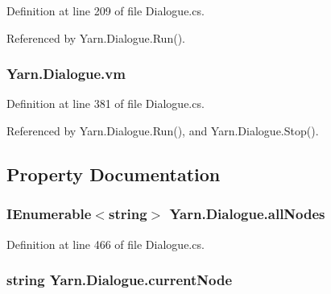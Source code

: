 Definition at line 209 of file Dialogue.\-cs.



Referenced by Yarn.\-Dialogue.\-Run().

\hypertarget{a00094_a8c1319357a9df6cff051328fb33224c7}{
\subsubsection[{vm}]{ Yarn.\-Dialogue.\-vm\hspace{0.3cm}{\ttfamily [private]}}}\label{a00094_a8c1319357a9df6cff051328fb33224c7}


Definition at line 381 of file Dialogue.\-cs.



Referenced by Yarn.\-Dialogue.\-Run(), and Yarn.\-Dialogue.\-Stop().



\subsection{Property Documentation}
\hypertarget{a00094_a0ee573e3d072bccf98ba1d975612d42c}{
\subsubsection[{all\-Nodes}]{\setlength{\rightskip}{0pt plus 5cm}I\-Enumerable$<$string$>$ Yarn.\-Dialogue.\-all\-Nodes\hspace{0.3cm}{\ttfamily [get]}}}\label{a00094_a0ee573e3d072bccf98ba1d975612d42c}


Definition at line 466 of file Dialogue.\-cs.

\hypertarget{a00094_af368b5c342d585dc6953876c5965ccc8}{
\subsubsection[{current\-Node}]{\setlength{\rightskip}{0pt plus 5cm}string Yarn.\-Dialogue.\-current\-Node\hspace{0.3cm}{\ttfamily [get]}}}\label{a00094_af368b5c342d585dc6953876c5965ccc8}


